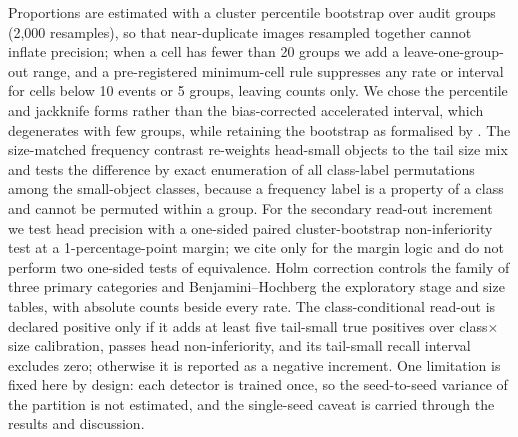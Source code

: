 Proportions are estimated with a cluster percentile bootstrap over audit groups (2{,}000 resamples), so that near-duplicate images resampled together cannot inflate precision; when a cell has fewer than 20 groups we add a leave-one-group-out range, and a pre-registered minimum-cell rule suppresses any rate or interval for cells below 10 events or 5 groups, leaving counts only. We chose the percentile and jackknife forms rather than the bias-corrected accelerated interval, which degenerates with few groups, while retaining the bootstrap as formalised by \citet{efron1987bca}. The size-matched frequency contrast re-weights head-small objects to the tail size mix and tests the difference by exact enumeration of all class-label permutations among the small-object classes, because a frequency label is a property of a class and cannot be permuted within a group. For the secondary read-out increment we test head precision with a one-sided paired cluster-bootstrap non-inferiority test at a 1-percentage-point margin; we cite \citet{schuirmann1987tost} only for the margin logic and do not perform two one-sided tests of equivalence. Holm correction controls the family of three primary categories and Benjamini--Hochberg the exploratory stage and size tables, with absolute counts beside every rate. The class-conditional read-out is declared positive only if it adds at least five tail-small true positives over class$\times$size calibration, passes head non-inferiority, and its tail-small recall interval excludes zero; otherwise it is reported as a negative increment. One limitation is fixed here by design: each detector is trained once, so the seed-to-seed variance of the partition is not estimated, and the single-seed caveat is carried through the results and discussion.




